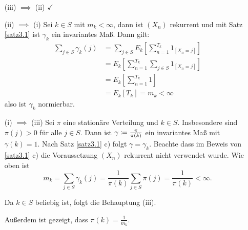\documentclass[a4paper,twoside,DIV15,BCOR12mm]{scrbook}
\begin{document}
\begin{beweis}
\begin{enumerate}[(iii) $\implies$ (ii)]
\item[(iii) $\implies$ (ii)] $\checkmark$
\item[(ii) $\implies$ (i)] Sei $k\in S$ mit $m_k<\infty$, dann ist $(X_n)$ rekurrent und mit Satz \ref{satz3.1} ist $\gamma_k$ ein invariantes Maß. Dann gilt:
\begin{align*}
\sum_{j\in S} \gamma_k(j) 
&= \sum_{j\in S} E_k[ \sum_{n=1}^{T_k} 1_{[X_n=j]}] \\
&= E_k[\sum_{n=1}^{T_k} \sum_{j\in S} 1_{[X_n=j]}] \\
&= E_k[\sum_{n=1}^{T_k} 1] \\
&= E_k[T_k] = m_k <\infty
\end{align*}
also ist $\gamma_k$ normierbar.

\item[(i) $\implies$ (iii)] Sei $\pi$ eine stationäre Verteilung und $k\in S$. Insbesondere sind $\pi(j)>0$ für alle $j\in S$. Dann ist $\gamma \da \frac{\pi}{\pi(k)}$ ein invariantes Maß mit $\gamma(k)=1$.  Nach Satz \ref{satz3.1} c) folgt $\gamma = \gamma_k$. Beachte dass im Beweis von \ref{satz3.1} c) die Voraussetzung $(X_n)$ rekurrent nicht verwendet wurde.
Wie oben ist 
\[
m_k=\sum_{j\in S}\gamma_k(j) = \frac 1 {\pi(k)} \sum_{j\in S} \pi(j) = \frac1{\pi(k)} < \infty.\]

Da $k\in S$ beliebig ist, folgt die Behauptung (iii).

Außerdem ist gezeigt, dass $\pi(k)=\frac1{m_k}$.
\end{enumerate}
\end{beweis}
\end{document}
